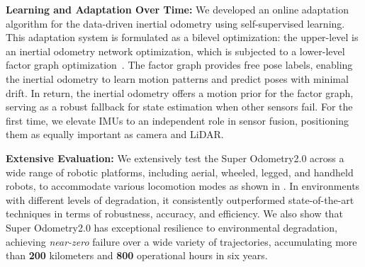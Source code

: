 \textbf{Learning and Adaptation Over Time:}
We developed an online adaptation algorithm for the data-driven inertial odometry using self-supervised learning\cite{wang2024imperative}.
This adaptation system is formulated as a bilevel optimization: the upper-level is an inertial odometry network optimization, which is subjected to a lower-level factor graph optimization~\cite{dellaert2017factor}.
The factor graph provides free pose labels, enabling the inertial odometry to learn motion patterns and predict poses with minimal drift.
In return, the inertial odometry offers a motion prior for the factor graph, serving as a robust fallback for state estimation when other sensors fail.
For the first time, we elevate IMUs to an independent role in sensor fusion, positioning them as equally important as camera and LiDAR.


\textbf{Extensive Evaluation:} We extensively test the Super Odometry2.0 across a wide range of robotic platforms, including aerial, wheeled, legged, and handheld robots, to accommodate various locomotion modes as shown in . In environments with different levels of degradation, it consistently outperformed state-of-the-art techniques in terms of robustness, accuracy, and efficiency. We also show that Super Odometry2.0 has exceptional resilience to environmental degradation, achieving \textit{near-zero} failure over a wide variety of trajectories, accumulating more than \textbf{200} kilometers and \textbf{800} operational hours in six years.

